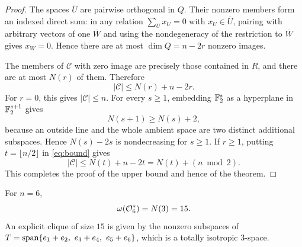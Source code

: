 \begin{proof}
The spaces \(\overline U\) are pairwise orthogonal in \(Q\).  Their
nonzero members form an indexed direct sum: in any relation
\(\sum_U x_U=0\) with \(x_U\in\overline U\), pairing with arbitrary
vectors of one \(\overline W\) and using the nondegeneracy of the
restriction to \(\overline W\) gives \(x_W=0\).  Hence there are at
most \(\dim Q=n-2r\) nonzero images.

The members of \(\mathcal C\) with zero image are precisely those
contained in \(R\), and there are at most \(N(r)\) of them.  Therefore
\begin{equation}\label{eq:bound}
|\mathcal C|\le N(r)+n-2r .
\end{equation}
For \(r=0\), this gives \(|\mathcal C|\le n\).  For every \(s\ge1\),
embedding \(\mathbb F_2^s\) as a hyperplane in \(\mathbb F_2^{s+1}\) gives
\[
N(s+1)\ge N(s)+2 ,
\]
because an outside line and the whole ambient space are two distinct
additional subspaces.  Hence \(N(s)-2s\) is nondecreasing for
\(s\ge1\).  If \(r\ge1\), putting \(t=\lfloor n/2\rfloor\) in
\eqref{eq:bound} gives
\[
|\mathcal C|\le N(t)+n-2t=N(t)+(n\bmod 2).
\]
This completes the proof of the upper bound and hence of the
theorem.
\end{proof}

\begin{corollary}\label{cor:15clique}
For \(n=6\),
\[
\omega(\mathcal O_6^*)=N(3)=15 .
\]
An explicit clique of size \(15\) is given by the nonzero subspaces
of \(T=\operatorname{span}\{e_1+e_2,\ e_3+e_4,\ e_5+e_6\}\), which is a totally
isotropic \(3\)-space.
\end{corollary}
